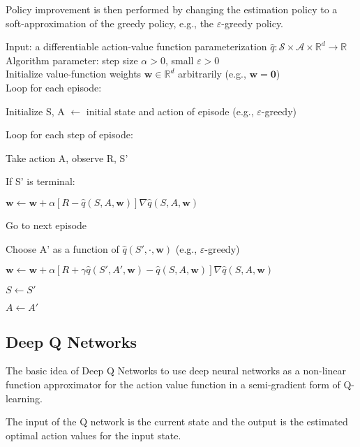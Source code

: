 Policy improvement is then performed by changing the estimation policy to a soft-approximation of the greedy policy, e.g., the $\varepsilon$-greedy policy.

\begin{tcolorbox}[colback=black!7!white,colframe=black!75!white,title=\textbf{Episodic Semi-gradient Sarsa for Estimating} $\mathbf{\hat{q}\approx q_\pi}$]
Input: a differentiable action-value function parameterization $\hat{q}: \mathcal{S}\times\mathcal{A}\times\mathbb{R}^d\rightarrow\mathbb{R}$\\
Algorithm parameter: step size $\alpha > 0$, small $\varepsilon > 0$\\
Initialize value-function weights $\mathbf{w}\in\mathbb{R}^d$ arbitrarily (e.g., $\mathbf{w=0}$)\\

Loop for each episode:

    \qquad Initialize S, A $\leftarrow$ initial state and action of episode (e.g., $\varepsilon$-greedy)

    \qquad Loop for each step of episode:

    \qquad\qquad Take action A, observe R, S'

    \qquad\qquad If S' is terminal:

        \qquad\qquad\qquad $\mathbf{w}\leftarrow\mathbf{w}+\alpha[R-\hat{q}(S, A, \mathbf{w})]\nabla \hat{q}(S, A, \mathbf{w})$

        \qquad\qquad\qquad Go to next episode

    \qquad\qquad Choose A' as a function of $\hat{q}(S', \cdot, \mathbf{w})$ (e.g., $\varepsilon$-greedy)

    \qquad\qquad $\mathbf{w}\leftarrow\mathbf{w}+\alpha[R+\gamma\hat{q}(S', A', \mathbf{w})-\hat{q}(S, A, \mathbf{w})]\nabla \hat{q}(S, A, \mathbf{w})$
    
    \qquad\qquad $S\leftarrow S'$

    \qquad\qquad $A\leftarrow A'$

\end{tcolorbox}

\subsection{Deep Q Networks}
The basic idea of Deep Q Networks to use deep neural networks as a non-linear function approximator for the action value function in a semi-gradient form of Q-learning.

The input of the Q network is the current state and the output is the estimated optimal action values for the input state.

